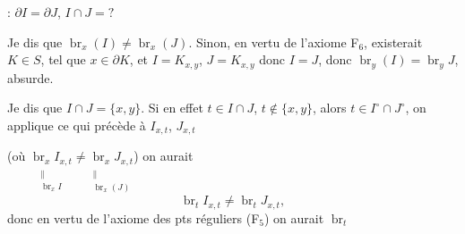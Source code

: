 \documentclass[11pt,a4paper]{article}
\begin{document}
 : $\partial I = \partial J$, $I \cap J = ?$

Je dis que $\operatorname{br}_x(I) \neq \operatorname{br}_x(J)$. Sinon, en vertu de l'axiome F$_6$, existerait \ill{} $K \in S$, tel que $x \in \partial K$, et $I = K_{x,y}$, $J = K_{x,y}$ donc $I = J$, donc $\operatorname{br}_y(I) = \operatorname{br}_y J$, absurde.

Je dis que $I \cap J = \{x, y\}$. Si en effet $t \in I \cap J$, $t \notin \{x, y\}$, alors $t \in I^{\circ} \cap J^{\circ}$, on applique ce qui précède à $I_{x,t}$, $J_{x,t}$


(où $\underset{\substack{\parallel \\ \operatorname{br}_x I}}{\operatorname{br}_x I_{x,t}} \neq \underset{\substack{\parallel \\ \operatorname{br}_x (J)}}{\operatorname{br}_x J_{x,t}}$) on aurait
\[
  \operatorname{br}_t I_{x,t} \neq \operatorname{br}_t J_{x,t},
\]
donc en vertu de l'axiome des  pts réguliers (F$_5$) on aurait $\operatorname{br}_t$
\end{document}
